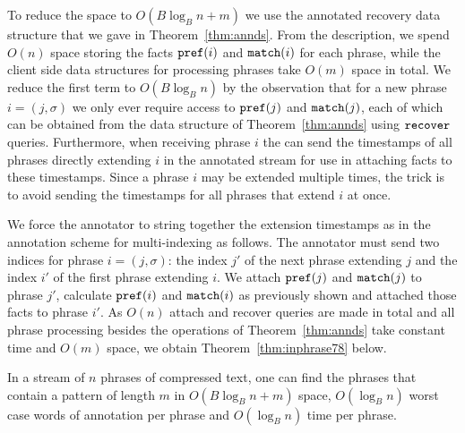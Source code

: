 To reduce the space to $O(B \log_B n + m)$ we use the annotated recovery data structure that we gave in Theorem~\ref{thm:annds}. From the description, we spend $O(n)$ space storing the facts $\mathtt{pref}(i)$ and $\mathtt{match}(i)$ for each phrase, while the client side data structures for processing phrases take $O(m)$ space in total. We reduce the first term to $O(B \log_B n)$ by the observation that for a new phrase $i = (j, \sigma)$ we only ever require access to $\mathtt{pref}(j)$ and $\mathtt{match}(j)$, each of which can be obtained from the data structure of Theorem~\ref{thm:annds} using $\mathtt{recover}$ queries. Furthermore, when receiving phrase $i$ the can send the timestamps of all phrases directly extending $i$ in the annotated stream for use in attaching facts to these timestamps. Since a phrase $i$ may be extended multiple times, the trick is to avoid sending the timestamps for all phrases that extend $i$ at once. 

We force the annotator to string together the extension timestamps as in the annotation scheme for multi-indexing as follows. The annotator must send two indices for phrase $i = (j, \sigma)$: the index $j'$ of the next phrase extending $j$ and the index $i'$ of the first phrase extending $i$. We attach $\mathtt{pref}(j)$ and $\mathtt{match}(j)$ to phrase $j'$, calculate $\mathtt{pref}(i)$ and $\mathtt{match}(i)$ as previously shown and attached those facts to phrase $i'$. As $O(n)$ attach and recover queries are made in total and all phrase processing besides the operations of Theorem~\ref{thm:annds} take constant time and $O(m)$ space, we obtain Theorem~\ref{thm:inphrase78} below. 

\begin{theorem}\label{thm:inphrase78}
    In a stream of $n$ phrases of compressed text, one can find the phrases that contain a pattern of length $m$ in $O(B \log_B n + m)$ space, $O(\log_B n)$ worst case words of annotation per phrase and $O(\log_B n)$ time per phrase.
\end{theorem}

